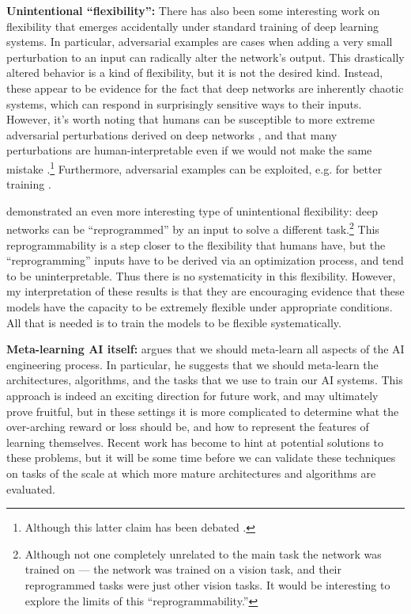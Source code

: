 \textbf{Unintentional ``flexibility'':} There has also been some interesting work on flexibility that emerges accidentally under standard training of deep learning systems. In particular, adversarial examples \citep{SzegedyAdv} are cases when adding a very small perturbation to an input can radically alter the network's output. This drastically altered behavior is a kind of flexibility, but it is not the desired kind. Instead, these appear to be evidence for the fact that deep networks are inherently chaotic systems, which can respond in surprisingly sensitive ways to their inputs. However, it's worth noting that humans can be susceptible to more extreme adversarial perturbations derived on deep networks \citep{Elsayed2018}, and that many perturbations are human-interpretable even if we would not make the same mistake \citep{Zhou2019}.\footnote{Although this latter claim has been debated \citep{Dujmovic2020}.} Furthermore, adversarial examples can be exploited, e.g. for better training \citep{Goodfellow2015}. \par 
\citet{Elsayed} demonstrated an even more interesting type of unintentional flexibility: deep networks can be ``reprogrammed'' by an input to solve a different task.\footnote{Although not one completely unrelated to the main task the network was trained on --- the network was trained on a vision task, and their reprogrammed tasks were just other vision tasks. It would be interesting to explore the limits of this ``reprogrammability.''} This reprogrammability is a step closer to the flexibility that humans have, but the ``reprogramming'' inputs have to be derived via an optimization process, and tend to be uninterpretable. Thus there is no systematicity in this flexibility. However, my interpretation of these results is that they are encouraging evidence that these models have the capacity to be extremely flexible under appropriate conditions. All that is needed is to train the models to be flexible systematically. \par  

\textbf{Meta-learning AI itself:} \citet{Clune2019} argues that we should meta-learn all aspects of the AI engineering process. In particular, he suggests that we should meta-learn the architectures, algorithms, and the tasks that we use to train our AI systems. This approach is indeed an exciting direction for future work, and may ultimately prove fruitful, but in these settings it is more complicated to determine what the over-arching reward or loss should be, and how to represent the features of learning themselves. Recent work has become to hint at potential solutions to these problems, but it will be some time before we can validate these techniques on tasks of the scale at which more mature architectures and algorithms are evaluated. \par 

